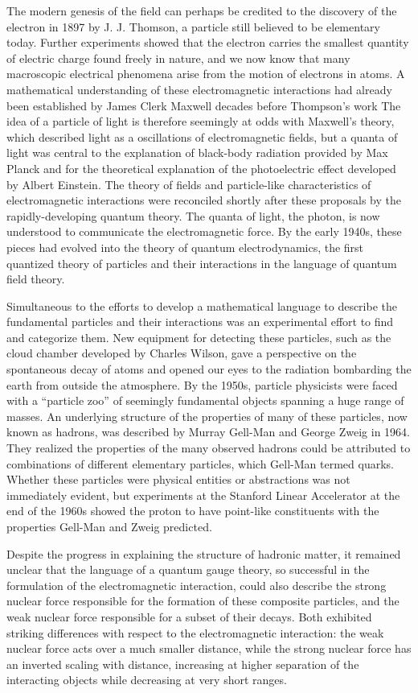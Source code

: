 The modern genesis of the field can perhaps be credited to 
the discovery of the electron in 1897 by J. J. Thomson, a particle still
believed to be elementary today.
Further experiments showed that the electron carries the smallest quantity of electric charge found
freely in nature, and we now know that many macroscopic electrical phenomena
arise from the motion of electrons in atoms.
A mathematical understanding of these electromagnetic interactions had 
already been established by James Clerk Maxwell decades before Thompson's work
The idea of a particle of light is therefore seemingly at odds with Maxwell's theory,
which described light as a oscillations of electromagnetic fields,
but a quanta of light was central to the explanation of black-body radiation provided by Max Planck 
and for the theoretical explanation of the photoelectric effect developed by Albert Einstein.
The theory of fields and particle-like characteristics of electromagnetic
interactions were reconciled shortly after these proposals by the 
rapidly-developing quantum theory.
The quanta of light, the photon, is now understood to communicate the electromagnetic force.
By the early 1940s, these pieces had evolved into the theory of quantum 
electrodynamics, the first
quantized theory of particles and their interactions in the language 
of quantum field theory. 

Simultaneous to the efforts to develop a mathematical language to describe 
the fundamental particles and their interactions was an experimental effort 
to find and categorize them. New equipment for detecting these particles,
such as the cloud chamber developed by Charles Wilson, 
gave a perspective on the spontaneous 
decay of atoms and opened our eyes to the radiation bombarding the earth from
outside the atmosphere. By the 1950s, particle physicists were faced with a ``particle zoo''
of seemingly fundamental objects spanning a huge range of masses. 
An underlying structure of the properties of many of these particles, 
now known as hadrons, was described by Murray Gell-Man and George Zweig in 1964.
They realized the properties of the many observed hadrons could be 
attributed to combinations of different elementary particles,
which Gell-Man termed quarks.
Whether these particles were physical entities or abstractions was 
not immediately evident, but experiments at the Stanford Linear Accelerator
at the end of the 1960s showed the proton to have point-like constituents
with the properties Gell-Man and Zweig predicted.

Despite the progress in explaining the structure of hadronic matter,
it remained unclear that the language of a quantum gauge theory, 
so successful in the formulation of the electromagnetic interaction, could 
also describe the strong nuclear force responsible for the formation
of these composite particles, and the weak nuclear force responsible for
a subset of their decays. Both exhibited striking differences with
respect to the electromagnetic interaction:
the weak nuclear force acts over a much smaller distance, while
the strong nuclear 
force has an inverted scaling with distance, increasing at higher separation
of the interacting objects while decreasing at very short ranges. 

